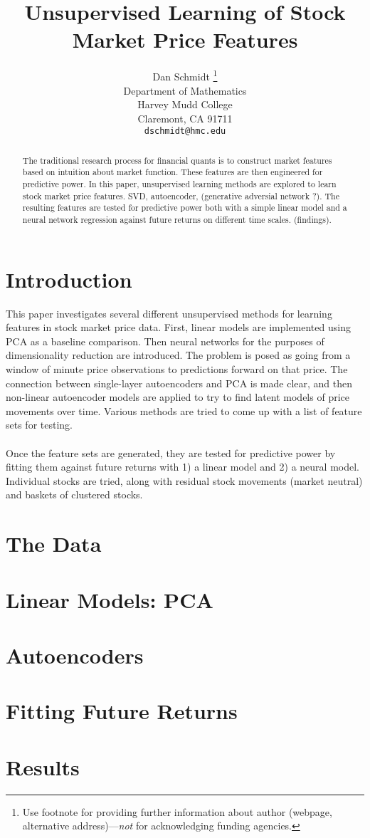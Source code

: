 \documentclass{article}
\title{Unsupervised Learning of Stock Market Price Features}
\author{
  Dan Schmidt \thanks{Use footnote for providing further
    information about author (webpage, alternative
    address)---\emph{not} for acknowledging funding agencies.} \\
  Department of Mathematics\\
  Harvey Mudd College\\
  Claremont, CA 91711 \\
  \texttt{dschmidt@hmc.edu} \\
}
\begin{document}

\maketitle

\begin{abstract}
The traditional research process for financial quants is to construct market features based on intuition about market
function. These features are then engineered for predictive power. In this paper, unsupervised learning methods are
explored to learn stock market price features. SVD, autoencoder, (generative adversial network ?). The resulting features
are tested for predictive power both with a simple linear model and a neural network regression against future returns on
different time scales. (findings). 
\end{abstract}

\section{Introduction}

This paper investigates several different unsupervised methods for learning
features in stock market price data. First, linear models are implemented
using PCA as a baseline comparison. Then neural networks for the purposes
of dimensionality reduction are introduced. The problem is posed as going
from a window of minute price observations to predictions forward on that 
price. The connection between single-layer autoencoders and PCA is made
clear, and then non-linear autoencoder models are applied to try to 
find latent models of price movements over time. Various methods
are tried to come up with a list of feature sets for testing. \\ \\
Once the feature sets are generated, they are tested for predictive
power by fitting them against future returns with 1) a linear model
and 2) a neural model. Individual stocks are tried, along with residual
stock movements (market neutral) and baskets of clustered stocks.

\section{The Data}

\section{Linear Models: PCA}

\section{Autoencoders}

\section{Fitting Future Returns}

\section{Results}
\end{document}
